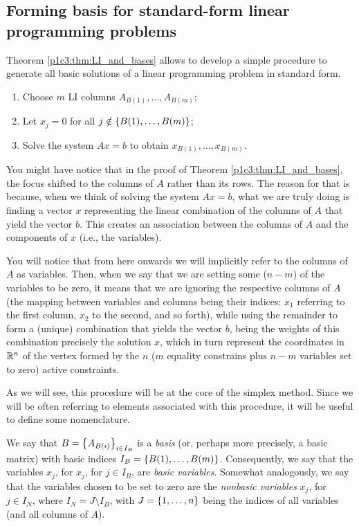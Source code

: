 \subsection{Forming basis for standard-form linear programming problems}

Theorem \ref{p1c3:thm:LI_and_bases} allows to develop a simple procedure to generate all basic solutions of a linear programming problem in standard form.

\begin{enumerate}
	\item Choose $m$ LI columns $A_{B(1)}, \dots, A_{B(m)}$;
	\item Let $x_j = 0$ for all $j \notin \left\{ B(1), \dots, B(m) \right \}$;
	\item Solve the system $Ax = b$ to obtain $x_{B(1)}, \dots, x_{B(m)}$.
\end{enumerate}

You might have notice that in the proof of Theorem \ref{p1c3:thm:LI_and_bases}, the focus shifted to the columns of $A$ rather than its rows. The reason for that is because, when we think of solving the system $Ax = b$, what we are truly doing is finding a vector $x$ representing the linear combination of the columns of $A$ that yield the vector $b$. This creates an association between the columns of $A$ and the components of $x$ (i.e., the variables). 

You will notice that from here onwards we will implicitly refer to the columns of $A$ as variables. Then, when we say that we are setting some ($n-m$) of the variables to be zero, it means that we are ignoring the respective columns of $A$ (the mapping between variables and columns being their indices: $x_1$ referring to the first column, $x_2$ to the second, and so forth), while using the remainder to form a (unique) combination that yields the vector $b$, being the weights of this combination precisely the solution $x$, which in turn represent the coordinates in $\mathbb{R}^n$ of the vertex formed by the $n$ ($m$ equality constrains plus $n-m$ variables set to zero) active constraints.   

As we will see, this procedure will be at the core of the simplex method. Since we will be often referring to elements associated with this procedure, it will be useful to define some nomenclature.

We say that $B = \left\{ A_{B(i)} \right \}_{i \in I_B}$ is a \emph{basis} (or, perhaps more precisely, a basic matrix) with basic indices $I_B = \left\{ B(1), \dots, B(m) \right \}$. Consequently, we say that the variables $x_j$, for $x_j$, for $j \in I_B$, are \emph{basic variables}. Somewhat analogously, we say that the variables chosen to be set to zero are the \emph{nonbasic variables} $x_j$, for $j \in I_N$, where $I_N = J \setminus I_B$, with $J = \left\{ 1, \dots, n \right \}$ being the indices of all variables (and all columns of $A$).

